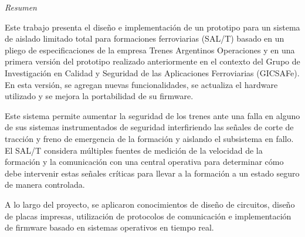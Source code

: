 
\vspace*{\fill}

\begin{center}

{\huge \textit{Resumen}}


\vspace{1.5cm}

\begin{adjustwidth}{2cm}{2cm}
\begin{center}
    

        
Este trabajo presenta el diseño e implementación de un prototipo para un sistema de aislado limitado total para formaciones ferroviarias (SAL/T) basado en un pliego de especificaciones de la empresa Trenes Argentinos Operaciones y en una primera versión del prototipo realizado anteriormente en el contexto del Grupo de Investigación en Calidad y Seguridad de las Aplicaciones Ferroviarias (GICSAFe). En esta versión, se agregan nuevas funcionalidades, se actualiza el hardware utilizado y se mejora la portabilidad de su firmware. \\

\vspace{.8cm}

Este sistema permite aumentar la seguridad de los trenes ante una falla en alguno de sus sistemas instrumentados de seguridad interfiriendo las señales de corte de tracción y freno de emergencia de la formación y aislando el subsistema en fallo. El SAL/T considera múltiples fuentes de medición de la velocidad de la formación y la comunicación con una central operativa para determinar cómo debe intervenir estas señales críticas para llevar a la formación a un estado seguro de manera controlada.  \\ 

\vspace{.8cm}

A lo largo del proyecto, se aplicaron conocimientos de diseño de circuitos, diseño de placas impresas, utilización de protocolos de comunicación e implementación de firmware basado en sistemas operativos en tiempo real.


\end{center}
\end{adjustwidth}

\end{center}

\vspace{8cm}

\vspace*{\fill}

